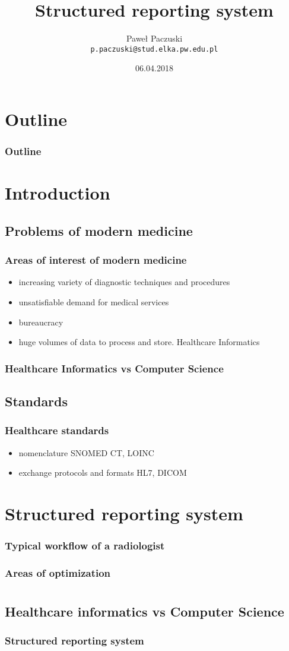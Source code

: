\documentclass{beamer}
\author{Paweł Paczuski\\ \texttt{p.paczuski@stud.elka.pw.edu.pl}}
\title{Structured reporting system}
\date{06.04.2018}
\begin{document}
\begin{frame}
\titlepage
\end{frame}

\section*{Outline}
\begin{frame}
\frametitle{Outline}
\tableofcontents
\end{frame}

\section{Introduction}
\subsection{Problems of modern medicine}
\begin{frame}
\frametitle{Areas of interest of modern medicine}
\begin{itemize}
	\item increasing variety of diagnostic techniques and procedures
	\item unsatisfiable demand for medical services
	\item bureaucracy
	\item huge volumes of data to process and store. \alert{Healthcare Informatics}
\end{itemize}
\end{frame}

\begin{frame}
\frametitle{Healthcare Informatics vs Computer Science}
\end{frame}

\subsection{Standards}
\begin{frame}
\frametitle{Healthcare standards}
\begin{itemize}
	\item nomenclature SNOMED CT, LOINC
	\item exchange protocols and formats HL7, DICOM
\end{itemize}
\end{frame}

\section{Structured reporting system}
\begin{frame}
\frametitle{Typical workflow of a radiologist}
\end{frame}

\begin{frame}
\frametitle{Areas of optimization}
\end{frame}

\section{}
\subsection{Healthcare informatics vs Computer Science}
\begin{frame}
\frametitle{Structured reporting system}
\end{frame}
\end{document}
